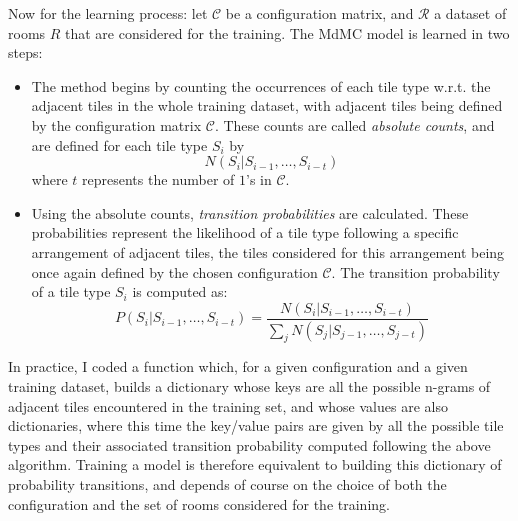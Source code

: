 \documentclass{article}
\begin{document}
\noindent Now for the learning process: let $\mathcal{C}$ be a configuration matrix, and $\mathcal{R}$ a dataset of rooms $R$ that are considered for the training. The MdMC model is learned in two steps:
\begin{itemize}
    \item The method begins by counting the occurrences of each tile type w.r.t. the adjacent tiles in the whole training dataset, with adjacent tiles being defined by the configuration matrix $\mathcal{C}$. These counts are called \textit{absolute counts}, and are defined for each tile type $S_i$ by $$N(S_i|S_{i-1},\ldots,S_{i-t})$$ where $t$ represents the number of $1$'s in $\mathcal{C}$.
    \item Using the absolute counts, \textit{transition probabilities} are calculated. These probabilities represent the likelihood of a tile type following a specific arrangement of adjacent tiles, the tiles considered for this arrangement being once again defined by the chosen configuration $\mathcal{C}$. The transition probability of a tile type $S_i$ is computed as:
    $$P(S_i|S_{i-1},\ldots,S_{i-t}) = \frac{N(S_i|S_{i-1},\ldots,S_{i-t})}{\sum_j N(S_j|S_{j-1},\ldots,S_{j-t})}$$
\end{itemize}
In practice, I coded a function which, for a given configuration and a given training dataset, builds a dictionary whose keys are all the possible n-grams of adjacent tiles encountered in the training set, and whose values are also dictionaries, where this time the key/value pairs are given by all the possible tile types and their associated transition probability computed following the above algorithm. Training a model is therefore equivalent to building this dictionary of probability transitions, and depends of course on the choice of both the configuration and the set of rooms considered for the training.
\end{document}
